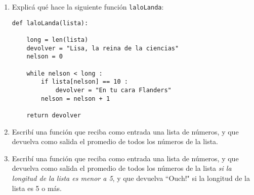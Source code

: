 \documentclass[a4paper,11pt,landscape,twocolumn]{article}
\begin{document}
\begin{enumerate}
\item Explicá qué hace la siguiente función \verb|laloLanda|:
\begin{verbatim}
def laloLanda(lista):

    long = len(lista)
    devolver = "Lisa, la reina de la ciencias"
    nelson = 0

    while nelson < long :
        if lista[nelson] == 10 :
            devolver = "En tu cara Flanders"
        nelson = nelson + 1

    return devolver
\end{verbatim}

\item Escribí una función que reciba como entrada una lista de números, y que devuelva como salida el promedio de todos los números de la lista.
\item Escribí una función que reciba como entrada una lista de números, y que devuelva como salida el promedio de todos los números de la lista \emph{si la longitud de la lista es menor a 5}, y que devuelva ``Ouch!" si la longitud de la lista es 5 o más.
\end{enumerate}
\end{document}
